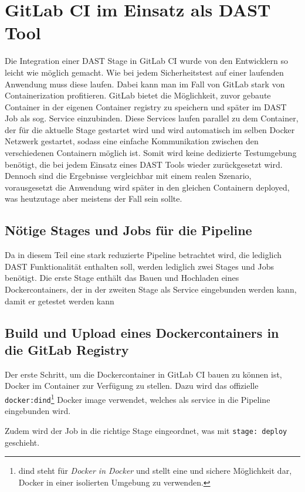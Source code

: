 \section{GitLab CI im Einsatz als DAST Tool}

Die Integration einer DAST Stage in GitLab CI wurde von den Entwicklern so leicht wie möglich gemacht.
Wie bei jedem Sicherheitstest auf einer laufenden Anwendung muss diese laufen.
Dabei kann man im Fall von GitLab stark von Containerization profitieren.
GitLab bietet die Möglichkeit, zuvor gebaute Container in der eigenen Container registry zu speichern und später im DAST Job als sog. Service einzubinden.
Diese Services laufen parallel zu dem Container, der für die aktuelle Stage gestartet wird und wird automatisch im selben Docker Netzwerk gestartet, sodass eine einfache Kommunikation zwischen den verschiedenen Containern möglich ist.
Somit wird keine dedizierte Testumgebung benötigt, die bei jedem Einsatz eines DAST Tools wieder zurückgesetzt wird.
Dennoch sind die Ergebnisse vergleichbar mit einem realen Szenario, vorausgesetzt die Anwendung wird später in den gleichen Containern deployed, was heutzutage aber meistens der Fall sein sollte.

\subsection{Nötige Stages und Jobs für die Pipeline}

Da in diesem Teil eine stark reduzierte Pipeline betrachtet wird, die lediglich DAST Funktionalität enthalten soll, werden lediglich zwei Stages und Jobs benötigt.
Die erste Stage enthält das Bauen und Hochladen eines Dockercontainers, der in der zweiten Stage als Service eingebunden werden kann, damit er getestet werden kann

\subsection{Build und Upload eines Dockercontainers in die GitLab Registry}

Der erste Schritt, um die Dockercontainer in GitLab CI bauen zu können ist, Docker im Container zur Verfügung zu stellen.
Dazu wird das offizielle \texttt{docker:dind}\footnote{dind steht für \textit{Docker in Docker} und stellt eine und sichere Möglichkeit dar, Docker in einer isolierten Umgebung zu verwenden.} Docker image verwendet, welches als service in die Pipeline eingebunden wird.

Zudem wird der Job in die richtige Stage eingeordnet, was mit \texttt{stage: deploy} geschieht.

